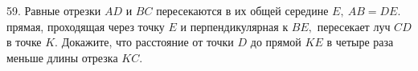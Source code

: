 59. Равные отрезки $AD$ и $BC$ пересекаются в их общей середине $E,\ AB=DE.$ прямая, проходящая через точку $E$ и перпендикулярная к $BE,$ пересекает луч $CD$ в точке $K.$ Докажите, что расстояние от точки $D$ до прямой $KE$ в четыре раза меньше длины отрезка $KC.$\\
